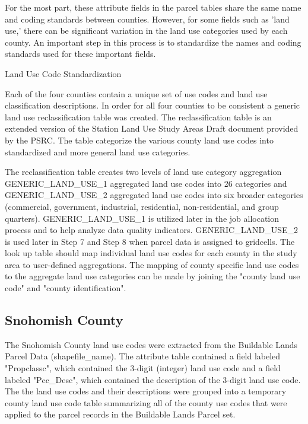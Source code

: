 For the most part, these attribute fields in the parcel tables
share the same name and coding standards between counties.
However, for some fields such as 'land use,' there can be
significant variation in the land use categories used by each
county.  An important step in this process is to standardize the
names and coding standards used for these important fields.


Land Use Code Standardization

Each of the four counties contain a unique set of use codes and
land use classification descriptions.  In order for all four
counties to be consistent a generic land use reclassification
table was created. The reclassification table is an extended
version of the Station Land Use Study Areas Draft document
provided by the PSRC. The table categorize the various county land
use codes into standardized and more general land use categories.

The reclassification table creates two levels of land use category
aggregation GENERIC_LAND_USE_1 aggregated land use codes into 26
categories and GENERIC_LAND_USE_2 aggregated land use codes into
six broader categories (commercial, government, industrial,
residential, non-residential, and group quarters).
GENERIC_LAND_USE_1 is utilized later in the job allocation process
and to help analyze data quality indicators. GENERIC_LAND_USE_2 is
used later in Step 7 and Step 8 when parcel data is assigned to
gridcells.  The look up table should map individual land use codes
for each county in the study area to user-defined aggregations.
The mapping of county specific land use codes to the aggregate
land use categories can be made by joining the "county land use
code" and "county identification".

\subsection{Snohomish County}

The Snohomish County land use codes were extracted from the
Buildable Lands Parcel Data (shapefile_name). The attribute table
contained a field labeled "Propclassc", which contained the
3-digit (integer) land use code and a field labeled "Pcc_Desc",
which contained the description of the 3-digit land use code. The
the land use codes and their descriptions were grouped into a
temporary county land use code table summarizing all of the county
use codes that were applied to the parcel records in the Buildable
Lands Parcel set.

